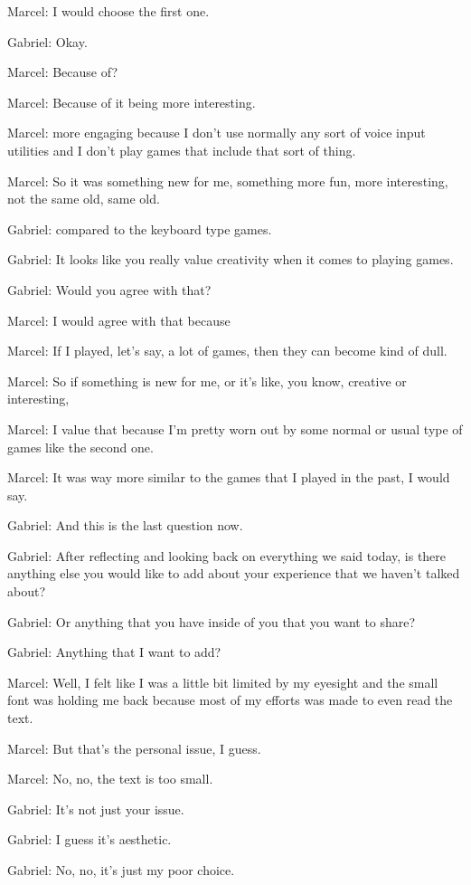 Marcel: I would choose the first one.

Gabriel: Okay.

Marcel: Because of?

Marcel: Because of it being more interesting.

Marcel: more engaging because I don't use normally any sort of voice input utilities and I don't play games that include that sort of thing.

Marcel: So it was something new for me, something more fun, more interesting, not the same old, same old.

Gabriel: compared to the keyboard type games.

Gabriel: It looks like you really value creativity when it comes to playing games.

Gabriel: Would you agree with that?

Marcel: I would agree with that because

Marcel: If I played, let's say, a lot of games, then they can become kind of dull.

Marcel: So if something is new for me, or it's like, you know, creative or interesting,

Marcel: I value that because I'm pretty worn out by some normal or usual type of games like the second one.

Marcel: It was way more similar to the games that I played in the past, I would say.

Gabriel: And this is the last question now.

Gabriel: After reflecting and looking back on everything we said today, is there anything else you would like to add about your experience that we haven't talked about?

Gabriel: Or anything that you have inside of you that you want to share?

Gabriel: Anything that I want to add?

Marcel: Well, I felt like I was a little bit limited by my eyesight and the small font was holding me back because most of my efforts was made to even read the text.

Marcel: But that's the personal issue, I guess.

Marcel: No, no, the text is too small.

Gabriel: It's not just your issue.

Gabriel: I guess it's aesthetic.

Gabriel: No, no, it's just my poor choice.

